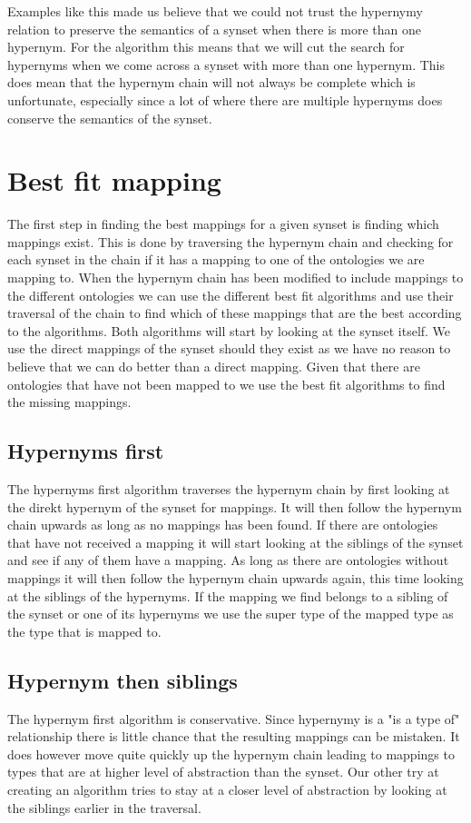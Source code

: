 Examples like this made us believe that we could not trust the hypernymy relation to preserve the semantics of a
synset when there is more than one hypernym.
For the algorithm this means that we will cut the search for hypernyms when we come across a synset with more than one hypernym.
This does mean that the hypernym chain will not always be complete which is unfortunate,
especially since a lot of where there are multiple hypernyms does conserve the semantics of the synset.

\section{Best fit mapping}
\label{BestFitMapping}

The first step in finding the best mappings for a given synset is finding which mappings exist.
This is done by traversing the hypernym chain and checking for each synset in the chain if it has a mapping to
one of the ontologies we are mapping to.
When the hypernym chain has been modified to include mappings to the different ontologies we can use the different
best fit algorithms and use their traversal of the chain to find which of these mappings that are the best according to
the algorithms.
Both algorithms will start by looking at the synset itself.
We use the direct mappings of the synset should they exist as we have no reason to believe that we can do better than a
direct mapping.
Given that there are ontologies that have not been mapped to we use the best fit algorithms to find the missing mappings.

\subsection{Hypernyms first}
The hypernyms first algorithm traverses the hypernym chain by first looking at the direkt hypernym of the synset for mappings.
It will then follow the hypernym chain upwards as long as no mappings has been found.
If there are ontologies that have not received a mapping it will start looking at the siblings of the synset and see
if any of them have a mapping.
As long as there are ontologies without mappings it will then follow the hypernym chain upwards again,
this time looking at the siblings of the hypernyms.
If the mapping we find belongs to a sibling of the synset or one of its hypernyms we use the super type of the mapped
type as the type that is mapped to.

\subsection{Hypernym then siblings}
The hypernym first algorithm is conservative.
Since hypernymy is a "is a type of" relationship there is little chance that the resulting mappings can be mistaken.
It does however move quite quickly up the hypernym chain leading to mappings to types that are at higher level
of abstraction than the synset.
Our other try at creating an algorithm tries to stay at a closer level of abstraction by looking at the siblings earlier
in the traversal.

